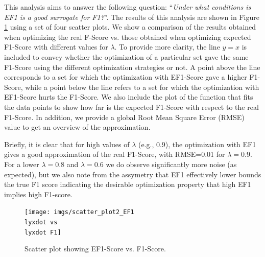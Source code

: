  This analysis aims to answer the following question: \textquotedblleft \textit{Under what conditions is EF1 is a good surrogate for F1?}\textquotedblright{}. The results of this analysis are shown in Figure \ref{fig:F1_vs_EF1_Enron} using a set of four scatter plots.
We show a comparison of the results obtained when optimizing the real F-Score vs. those obtained when optimizing expected F1-Score with different values for $\lambda$.
To provide more clarity, the line $y = x$ is included to convey whether the optimization of a particular set gave the same F1-Score using the different optimization strategies or not. A point above the line corresponds to a set for which the optimization with EF1-Score gave a higher F1-Score, while a point below the line refers to a set for which the optimization with EF1-Score  hurts the F1-Score. We also include the plot of the function that fits the data points to show how far is the expected F1-Score with respect to the real F1-Score. In addition, we provide a global Root Mean Square Error (RMSE) value to get an overview of the approximation.

Briefly, it is clear that for high values of $\lambda$ (e.g., 0.9), the optimization with EF1 gives a good approximation of the real F1-Score, with RMSE=0.01 for $\lambda=0.9$. For a lower $\lambda=0.8$ and $\lambda=0.6$ we do observe significantly more noise (as expected), but we also note from the assymetry that EF1 effectively lower bounds the true F1 score indicating the desirable optimization property that high EF1 implies high F1-score.

\begin{figure}[H]
\begin{centering}
\par\end{centering}
\begin{centering}
{\texttt{[image: imgs/scatter\_plot2\_EF1\\lyxdot vs\\lyxdot F1]}}
\par\end{centering}
\caption{Scatter plot showing EF1-Score vs. F1-Score.}
\label{fig:F1_vs_EF1_Enron}
\end{figure}


